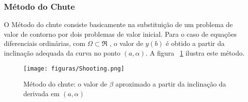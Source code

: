 \subsubsection{Método do Chute}
O Método do chute consiste basicamente na substituição de um problema de valor de contorno por dois problemas de valor inicial. Para o caso de equações diferenciais ordinárias, com $ \Omega \subset \Re $ , o valor de  $ y(b) $ é obtido a partir da inclinação adequada da curva no ponto $ (a, \alpha) $. A figura ~\ref{fig:chute} ilustra este método.
\citep[p. 674]{burden_faires}


\begin{figure}[ht!]
\centering
\texttt{[image: figuras/Shooting.png]}
\caption{Método do chute: o valor de $ \beta $ aproximado a partir da inclinação da derivada em $ (a, \alpha) $}
\label{fig:chute}
\end{figure}

